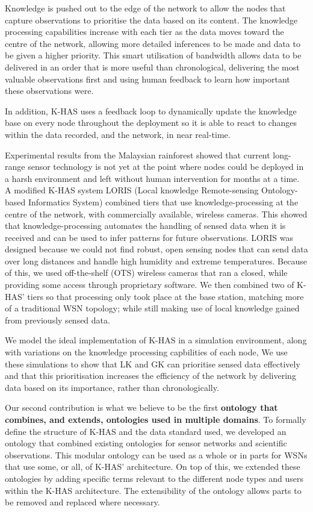 Knowledge is pushed out to the edge of the network to allow the nodes that capture observations to prioritise the data based on its content. The knowledge processing capabilities increase with each tier as the data moves toward the centre of the network, allowing more detailed inferences to be made and data to be given a higher priority. This smart utilisation of bandwidth allows data to be delivered in an order that is more useful than chronological, delivering the most valuable observations first and using human feedback to learn how important these observations were. 

In addition, K-HAS uses a feedback loop to dynamically update the knowledge base on every node throughout the deployment so it is able to react to changes within the data recorded, and the network, in near real-time.

Experimental results from the Malaysian rainforest showed that current long-range sensor technology is not yet at the point where nodes could be deployed in a harsh environment and left without human intervention for months at a time. A modified K-HAS system LORIS (Local knowledge Remote-sensing Ontology-based Informatics System) combined tiers that use knowledge-processing at the centre of the network, with commercially available, wireless cameras. This showed that knowledge-processing automates the handling of sensed data when it is received and can be used to infer patterns for future observations. LORIS was designed because we could not find robust, open sensing nodes that can send data over long distances and handle high humidity and extreme temperatures. Because of this, we used off-the-shelf (OTS) wireless cameras that ran a closed, while providing some access through proprietary software. We then combined two of K-HAS' tiers so that processing only took place at the base station, matching more of a traditional WSN topology; while still making use of local knowledge gained from previously sensed data.

We model the ideal implementation of K-HAS in a simulation environment, along with variations on the knowledge processing capbilities of each node, We use these simulations to show that LK and GK can prioritise sensed data effectively and that this prioritisation increases the efficiency of the network by delivering data based on its importance, rather than chronologically.

Our second contribution is what we believe to be the first \textbf{ontology that combines, and extends, ontologies used in multiple domains}. To formally define the structure of K-HAS and the data standard used, we developed an ontology that combined existing ontologies for sensor networks and scientific observations. This modular ontology can be used as a whole or in parts for WSNs that use some, or all, of K-HAS' architecture. On top of this, we extended these ontologies by adding specific terms relevant to the different node types and users within the K-HAS architecture. The extensibility of the ontology allows parts to be removed and replaced where necessary.


